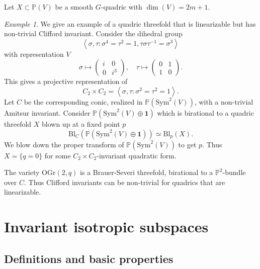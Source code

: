 \documentclass[12pt]{amsart}
\numberwithin{equation}{section}
\newcommand{\bP}{\mathbb{P}}
\newcommand{\Bl}{\mathrm{Bl}}
\newcommand{\OGr}{\mathrm{OGr}}
\newcommand{\Sym}{\mathrm{Sym}}
\theoremstyle{plain}
\theoremstyle{definition}
\theoremstyle{remark}
\newtheorem{exam}[prop]{Example}
\begin{document}
Let $X \subset \bP(V)$ be a smooth $G$-quadric with 
$\dim(V)=2m+1$. 

\begin{exam}
We give an example of a quadric threefold that is linearizable but has non-trivial Clifford invariant. 
Consider the dihedral group 
$$
\left<\sigma,\tau: \sigma^4=\tau^2=1, \tau\sigma\tau^{-1}=\sigma^3\right>
$$
with representation $V$
$$ \sigma \mapsto \left( \begin{matrix} i & 0 \\
                                        0 & i^3 
                            \end{matrix} \right), \quad 
    \tau \mapsto \left( \begin{matrix} 0 & 1 \\ 1 & 0 
                            \end{matrix} \right).
                            $$
This gives a projective representation of 
$$
C_2\times C_2 =  \left<\sigma, \tau: \sigma^2=\tau^2=1\right>.
$$
Let $C$ be the corresponding conic, realized in
$\bP(\Sym^2(V))$, with a non-trivial Amitsur invariant. Consider $\bP(\Sym^2(V) \oplus \mathbf{1})$ which is birational to a quadric threefold $X$ blown up at a fixed point $p$
$$ \Bl_C(\bP(\Sym^2(V) \oplus \mathbf{1})) \simeq
\Bl_p(X).$$
We blow down the proper transform of $\bP(\Sym^2(V))$
to get $p$. Thus $X=\{q=0\}$ for some $C_2\times C_2$-invariant quadratic form.  

The variety $\OGr(2,q)$ is a Brauer-Severi threefold, birational to a 
$\bP^2$-bundle over $C$. Thus Clifford invariants can
be non-trivial for quadrics that are linearizable.  
\end{exam}












\section{Invariant isotropic subspaces}
\label{sect:inv}





\subsection*{Definitions and basic properties}
\end{document}

